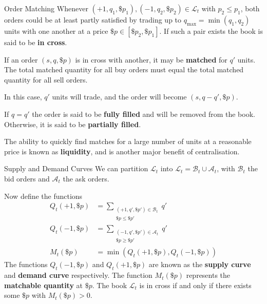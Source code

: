 \documentclass{beamer}
\begin{document}
\begin{frame}{Order Matching}
	Whenever $(+1,q_1,\$p_1), (-1,q_2,\$p_2)\in\mathcal{L}_t$ with $p_2\leq p_1$, both orders could be at least partly satisfied by trading up to $q_{\max}=\min(q_1,q_2)$ units with one another at a price $\$p\in[\$p_2,\$p_1]$. If such a pair exists the book is said to be \textbf{in cross}.

	\pause

	If an order $(s,q,\$p)$ is in cross with another, it may be \textbf{matched} for $q'$ units. The total matched quantity for all buy orders must equal the total matched quantity for all sell orders.

	In this case, $q'$ units will trade, and the order will become $(s,q-q',\$p)$.

	If $q=q'$ the order is said to be \textbf{fully filled} and will be removed from the book. Otherwise, it is said to be \textbf{partially filled}.

	The ability to quickly find matches for a large number of units at a reasonable price is known as \textbf{liquidity}, and is another major benefit of centralisation.
\end{frame}

\begin{frame}{Supply and Demand Curves}
	We can partition $\mathcal{L}_t$ into $\mathcal{L}_t = \mathcal{B}_t\cup\mathcal{A}_t$, with $\mathcal{B}_t$ the bid orders and $\mathcal{A}_t$ the ask orders.

	\pause

	Now define the functions
	\begin{align*}
		Q_t(+1,\$p)	&= \sum_{\substack{(+1,q',\$p') \in \mathcal{B}_t \\ \$p\leq \$p'}} q'
	\\	Q_t(-1,\$p)	&= \sum_{\substack{(-1,q',\$p') \in \mathcal{A}_t \\ \$p\geq \$p'}} q'
	\\	M_t(\$p)	&= \min(Q_t(+1,\$p),Q_t(-1,\$p))
	\end{align*}
	\pause
	The functions $Q_t(-1,\$p)$ and $Q_t(+1,\$p)$ are known as the \textbf{supply curve} and \textbf{demand curve} respectively. The function $M_t(\$p)$ represents the \textbf{matchable quantity} at $\$p$.
	\pause
	The book $\mathcal{L}_t$ is in cross if and only if there exists some $\$p$ with $M_t(\$p)>0$.
\end{frame}
\end{document}

